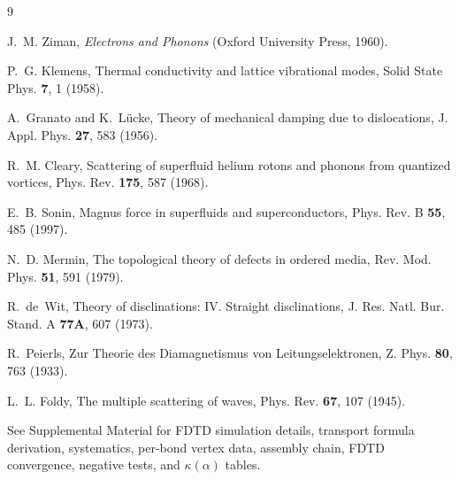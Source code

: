 \documentclass[aps,prl,twocolumn,superscriptaddress]{revtex4-2}
\begin{document}
\begin{thebibliography}{9}

J.~M. Ziman, \textit{Electrons and Phonons}
(Oxford University Press, 1960).

P.~G. Klemens,
Thermal conductivity and lattice vibrational modes,
Solid State Phys. \textbf{7}, 1 (1958).

A.~Granato and K.~L\"ucke,
Theory of mechanical damping due to dislocations,
J. Appl. Phys. \textbf{27}, 583 (1956).

R.~M. Cleary,
Scattering of superfluid helium rotons and phonons from quantized vortices,
Phys. Rev. \textbf{175}, 587 (1968).

E.~B. Sonin,
Magnus force in superfluids and superconductors,
Phys. Rev. B \textbf{55}, 485 (1997).

N.~D. Mermin,
The topological theory of defects in ordered media,
Rev. Mod. Phys. \textbf{51}, 591 (1979).

R.~de~Wit,
Theory of disclinations: IV. Straight disclinations,
J. Res. Natl. Bur. Stand. A \textbf{77A}, 607 (1973).

R.~Peierls,
Zur Theorie des Diamagnetismus von Leitungselektronen,
Z. Phys. \textbf{80}, 763 (1933).

L.~L. Foldy,
The multiple scattering of waves,
Phys. Rev. \textbf{67}, 107 (1945).

See Supplemental Material for FDTD simulation details, transport formula
derivation, systematics, per-bond vertex data, assembly chain,
FDTD convergence, negative tests, and $\kappa(\alpha)$ tables.

\end{thebibliography}
\end{document}
